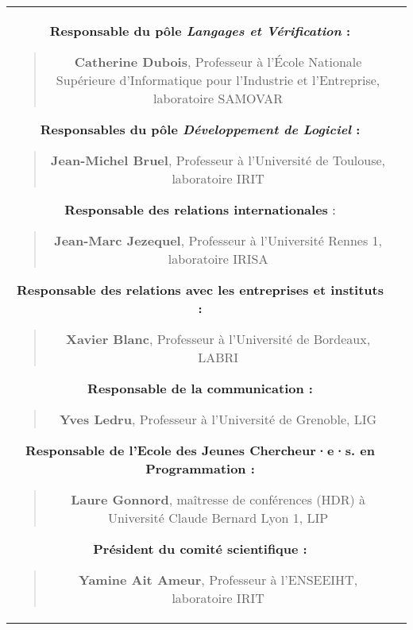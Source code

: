\documentclass[11pt]{article}
\begin{document}
\begin{small}
\begin{center}
\begin{tabular}{c|c}
\begin{minipage}[t]{.5\textwidth}
  \textbf{Responsable du pôle \textit{Langages et Vérification} :}
  \begin{quote}
     \textbf{Catherine Dubois}, Professeur à l'École Nationale Supérieure d'Informatique pour l'Industrie et l'Entreprise, laboratoire SAMOVAR
  \end{quote}

  \textbf{Responsables du pôle \textit{Développement de Logiciel} :}
    \begin{quote}
      \textbf{Jean-Michel Bruel}, Professeur à l'Université de Toulouse,
laboratoire IRIT
     \end{quote}

  \textbf{Responsable des relations internationales} :
    \begin{quote}
      \textbf{Jean-Marc Jezequel}, Professeur à l'Université Rennes 1, laboratoire IRISA
     \end{quote}
  
  \textbf{Responsable des relations avec les entreprises et instituts :}
   \begin{quote}
      \textbf{Xavier Blanc}, Professeur à l'Université de Bordeaux,  LABRI
    \end{quote}

    \textbf{Responsable de la communication :}
    \begin{quote}
        \textbf{Yves Ledru}, Professeur à l'Université de Grenoble, LIG
    \end{quote}

\textbf{Responsable de l'Ecole des Jeunes Chercheur·e·s. en Programmation :}
\begin{quote}
  \textbf{Laure Gonnord}, maîtresse de conférences (HDR) à Université Claude Bernard Lyon 1, LIP
  \end{quote}
  
\textbf{Président du comité scientifique :}
\begin{quote}
   \textbf{Yamine Ait Ameur}, Professeur à l'ENSEEIHT, laboratoire IRIT
  \end{quote}
\end{minipage}

\end{tabular}
\end{center}

\end{small}
\medskip

\noindent
\end{document}
